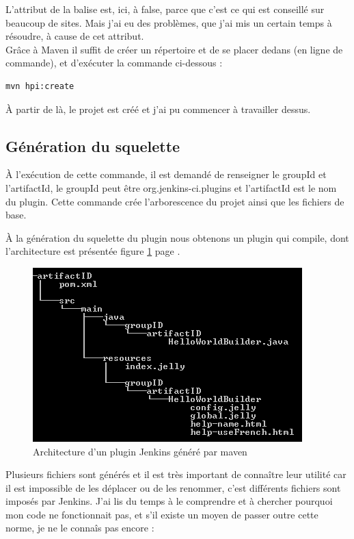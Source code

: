 L'attribut de la balise  est, ici, à false, parce que c'est ce qui est conseillé sur beaucoup de sites. Mais j'ai eu des problèmes, que j'ai mis un certain temps à résoudre, à cause de cet attribut.\\
Grâce à \gls{Maven} il suffit de créer un répertoire et de se placer dedans (en ligne de commande), et d'exécuter la commande ci-dessous :
\begin{lstlisting}[language=xml]
mvn hpi:create
\end{lstlisting}

\`{A} partir de là, le projet est créé et j'ai pu commencer à travailler dessus.


\subsection{Génération du squelette}
\`{A} l'exécution de cette commande, il est demandé de renseigner le groupId et l'artifactId, le groupId peut être  org.jenkins-ci.plugins et l'artifactId est le nom du plugin. Cette commande crée l'arborescence du projet ainsi que les fichiers de base. 


\`{A} la génération du squelette du plugin nous obtenons un plugin qui compile, dont l'architecture est présentée figure \ref{figure:hpiCreate} page \pageref{figure:hpiCreate}.\\

\begin{figure}[h]
  \centering
      \includegraphics{images/hpiCreate.png}
  \caption{Architecture d'un plugin Jenkins généré par maven}
	\label{figure:hpiCreate}
\end{figure}


Plusieurs fichiers sont générés et il est très important de conna\^{i}tre leur utilité car il est impossible de les déplacer ou de les renommer, c'est différents fichiers sont imposés par Jenkins. J'ai lis du temps à le comprendre et à chercher pourquoi mon code ne fonctionnait pas, et s'il existe un moyen de passer outre cette norme, je ne le connaîs pas encore :

